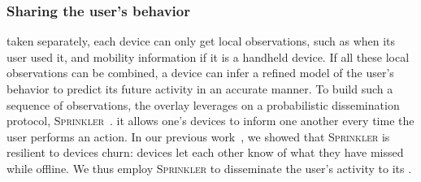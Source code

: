 \subsubsection{Sharing the user's behavior} %
\label{sub:sharing_knowledge}

taken separately, each device can only get local observations, such as when its user used it, and mobility information if it is a handheld device.
If all these local observations can be combined, a device can infer a refined model of the user’s behavior to predict its future activity in an accurate manner. To build such a sequence of observations, 
the \squad overlay leverages on a probabilistic dissemination protocol, \textsc{Sprinkler}~\cite{luxey:hal-01704172}.
it allows one's devices to inform one another every time the user performs an action.
In our previous work~\cite{luxey:cascade}, we showed that \textsc{Sprinkler} is resilient to devices churn: 
devices let each other know of what they have missed while offline.
We thus employ \textsc{Sprinkler} to disseminate the user's activity to its \squad.




